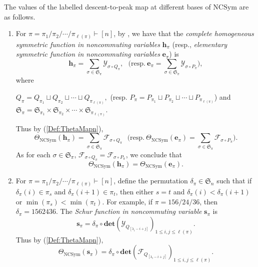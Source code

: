 \documentclass[11pt]{amsart}
\numberwithin{equation}{section}
\newcommand{\NCSym}{\mathrm{NCSym}}
\newcommand{\scrY}{{\mathscr{Y}}}
\newcommand{\scrF}{{\mathscr{F}}}
\newcommand{\bfdet}{{\mathbf{det}}}
\newcommand{\frakS}{{\mathfrak{S}}}
\newcommand{\bfh}{{\mathbf{h}}}
\newcommand{\bfe}{{\mathbf{e}}}
\newcommand{\bfs}{{\mathbf{s}}}
\begin{document}
\begin{enumerate}[leftmargin=*]
 The values of the labelled descent-to-peak map at different bases of $\NCSym$ are as follows.
\begin{enumerate} 
\item For $\pi=\pi_1/\pi_2/\cdots/\pi_{\ell(\pi)}\vdash [n]$, by \cite[Section 10]{ALvW23},  we have that the \emph{complete homogeneous symmetric function in noncommuting variables} $\bfh_\pi$ (resp.,  \emph{elementary symmetric function in noncommuting variables} $\bfe_\pi$) is 
$$\bfh_\pi=\sum_{\sigma\in \frakS_{\pi}} \scrY_{\sigma\circ Q_{\pi}},~~~{\text{(resp.}}~ \bfe_\pi=\sum_{\sigma\in \frakS_{\pi}} \scrY_{\sigma\circ P_{\pi}}),$$  where 
\begin{center} $Q_\pi=Q_{\pi_1}\sqcup Q_{\pi_2}\sqcup \cdots \sqcup Q_{\pi_{\ell(\pi)}},$ (resp. $P_\pi=P_{\pi_1}\sqcup P_{\pi_2}\sqcup \cdots \sqcup P_{\pi_{\ell(\pi)}}$)
and $\mathfrak{S}_{\pi}=\mathfrak{S}_{\pi_1}\times \mathfrak{S}_{\pi_2} \times \cdots \times \mathfrak{S}_{\pi_{\ell(\pi)}}.$
\end{center} 
Thus by (\ref{Def:ThetaMapn}),
$$\Theta_{\NCSym}(\bfh_\pi)=\sum_{\sigma\in \frakS_{\pi}} \scrF_{\sigma\circ Q_{\pi}}~~~\text{(resp.}~ \Theta_{\NCSym}(\bfe_\pi)=\sum_{\sigma\in \frakS_{\pi}} \scrF_{\sigma\circ P_{\pi}}).$$ As for each $\sigma\in \mathfrak{S}_\pi$, $\scrF_{\sigma\circ Q_{\pi}}=\scrF_{\sigma\circ P_{\pi}}$, we conclude that 
\begin{equation}\label{eq:theta-h-e}
\Theta_{\NCSym}(\bfh_\pi) = \Theta_{\NCSym}(\bfe_\pi).
\end{equation} 





\item For $\pi=\pi_1/\pi_2/\cdots/\pi_{\ell(\pi)}\vdash [n]$, define the permutation $\delta_\pi\in\mathfrak{S}_n$ such that  
if $\delta_\pi(i)\in \pi_s$ and $\delta_\pi(i+1)\in \pi_t$, then either $s=t$ and $\delta_\pi(i)<\delta_\pi(i+1)$ or $\min(\pi_s)<\min(\pi_t)$. For example, if $\pi=156/24/36$, then $\delta_\pi=1562436$.
The \emph{Schur function in noncommuting variable} $\bfs_\pi$ is 
 \[\bfs_\pi=\delta_{\pi}\circ \bfdet \left( \scrY_{Q_{[\lambda_i-i+j]}}  \right)_{1\leq i,j\leq \ell(\pi)}.\]
 Thus by (\ref{Def:ThetaMapn}),
$$\Theta_{\NCSym}(\bfs_\pi)=\delta_{\pi}\circ \bfdet \left( \scrF_{Q_{[\lambda_i-i+j]}}  \right)_{1\leq i,j\leq \ell(\pi)}.$$


\end{enumerate}
\end{enumerate}
\end{document}
